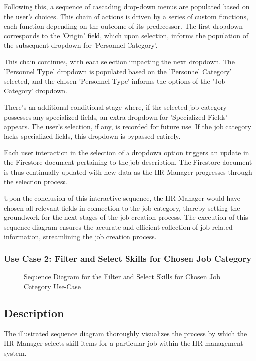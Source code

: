 Following this, a sequence of cascading drop-down menus are populated based on the user's choices. This chain of actions is driven by a series of custom functions, each function depending on the outcome of its predecessor. The first dropdown corresponds to the 'Origin' field, which upon selection, informs the population of the subsequent dropdown for 'Personnel Category'.

This chain continues, with each selection impacting the next dropdown. The 'Personnel Type' dropdown is populated based on the 'Personnel Category' selected, and the chosen 'Personnel Type' informs the options of the 'Job Category' dropdown.

There's an additional conditional stage where, if the selected job category possesses any specialized fields, an extra dropdown for 'Specialized Fields' appears. The user's selection, if any, is recorded for future use. If the job category lacks specialized fields, this dropdown is bypassed entirely.

Each user interaction in the selection of a dropdown option triggers an update in the Firestore document pertaining to the job description. The Firestore document is thus continually updated with new data as the HR Manager progresses through the selection process.

Upon the conclusion of this interactive sequence, the HR Manager would have chosen all relevant fields in connection to the job category, thereby setting the groundwork for the next stages of the job creation process. The execution of this sequence diagram ensures the accurate and efficient collection of job-related information, streamlining the job creation process.


\newpage
\subsubsection{Use Case 2: Filter and Select Skills for Chosen Job Category} 

\begin{figure}[H]
    \centering
    \caption{ Sequence Diagram for the Filter and Select Skills for Chosen Job Category Use-Case }
    \label{fig:UseCase2Sprint2_Sequence_Diagram}
\end{figure}

\newpage
\subsection*{Description}
The illustrated sequence diagram thoroughly visualizes the process by which the HR Manager selects skill items for a particular job within the HR management system.

